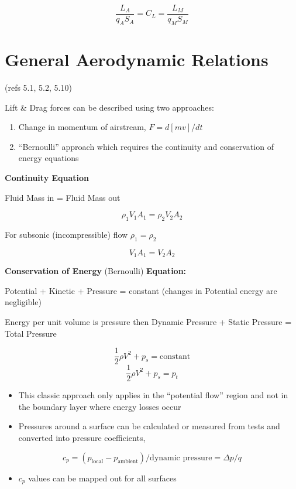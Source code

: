 \documentclass[
]{book}
\providecommand{\tightlist}{%
  \setlength{\itemsep}{0pt}\setlength{\parskip}{0pt}}
\begin{document}
\[\frac{L_A}{q_A S_A} = C_L = \frac{L_M}{q_M S_M} \]

\hypertarget{general-aerodynamic-relations}{%
\section{General Aerodynamic Relations}\label{general-aerodynamic-relations}}

(refs 5.1, 5.2, 5.10)

Lift \& Drag forces can be described using two approaches:

\begin{enumerate}
\def\labelenumi{\arabic{enumi}.}
\tightlist
\item
  Change in momentum of airstream, \(F=d[mv]/dt\)
\item
  ``Bernoulli'' approach which requires the continuity and conservation of energy equations
\end{enumerate}

\textbf{Continuity Equation}

Fluid Mass in = Fluid Mass out

\[\rho_1 V_1 A_1 = \rho_2 V_2 A_2\]

For subsonic (incompressible) flow \(\rho_1 = \rho_2\)

\[V_1 A_1 = V_2 A_2\]

\textbf{Conservation of Energy} (Bernoulli) \textbf{Equation:}

Potential + Kinetic + Pressure = constant (changes in Potential energy are negligible)

Energy per unit volume is pressure then Dynamic Pressure + Static Pressure = Total Pressure

\[\frac{1}{2}\rho V^2 + p_s = \text{constant} \]
\[\frac{1}{2}\rho V^2 + p_s = p_t \]

\begin{itemize}
\tightlist
\item
  This classic approach only applies in the ``potential flow'' region and not in the boundary layer where energy losses occur
\item
  Pressures around a surface can be calculated or measured from tests and converted into pressure coefficients,
\end{itemize}

\[c_p = \left( p_{\mathrm{local}} - p_{\mathrm{ambient}} \right) / \text{dynamic pressure} = \Delta p/q \]

\begin{itemize}
\tightlist
\item
  \(c_p\) values can be mapped out for all surfaces
\end{itemize}
\end{document}
